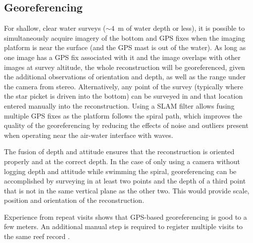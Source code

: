 



\subsection{Georeferencing}
For shallow, clear water surveys ($\sim{4}$~m of water depth or less), it is possible to simultaneously acquire imagery of the bottom and GPS fixes when the imaging platform is near the surface (and the GPS mast is out of the water). As long as one image has a GPS fix associated with it and the image overlaps with other images at survey altitude, the whole reconstruction will be georeferenced, given the additional observations of orientation and depth, as well as the range under the camera from stereo. Alternatively, any point of the survey (typically where the star picket is driven into the bottom) can be surveyed in and that location entered manually into the reconstruction. Using a SLAM filter allows fusing multiple GPS fixes as the platform follows the spiral path, which improves the quality of the georeferencing by reducing the effects of noise and outliers present when operating near the air-water interface with waves.

The fusion of depth and attitude ensures that the reconstruction is oriented properly and at the correct depth. In the case of only using a camera without logging depth and attitude while swimming the spiral, georeferencing can be accomplished by surveying in at least two points and the depth of a third point that is not in the same vertical plane as the other two. This would provide scale, position and orientation of the reconstruction.

Experience from repeat visits shows that GPS-based georeferencing is good to a few meters. An additional manual step is required to register multiple visits to the same reef record \cite{Bryson_2013} \cite{Bryson:2012uq}.

